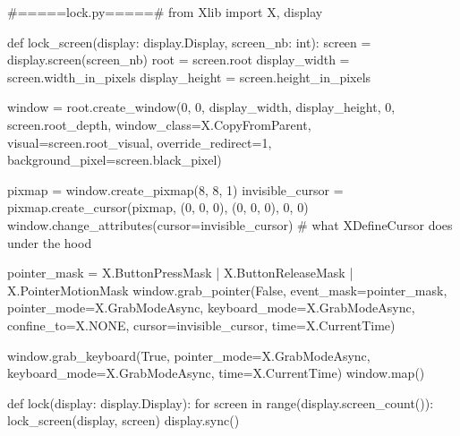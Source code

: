 \documentclass[french]{report}
\begin{document}
\begin{python}
#=====lock.py=====#
from Xlib import X, display


def lock_screen(display: display.Display, screen_nb: int):
  screen = display.screen(screen_nb)
  root = screen.root
  display_width = screen.width_in_pixels
  display_height = screen.height_in_pixels

  window = root.create_window(0, 0, display_width, display_height,
                              0, screen.root_depth, window_class=X.CopyFromParent,
                              visual=screen.root_visual,
                              override_redirect=1, background_pixel=screen.black_pixel)

  pixmap = window.create_pixmap(8, 8, 1)
  invisible_cursor = pixmap.create_cursor(pixmap, (0, 0, 0), (0, 0, 0), 0, 0)
  window.change_attributes(cursor=invisible_cursor) # what XDefineCursor does under the hood

  pointer_mask = X.ButtonPressMask | X.ButtonReleaseMask | X.PointerMotionMask
  window.grab_pointer(False, event_mask=pointer_mask,
                      pointer_mode=X.GrabModeAsync, keyboard_mode=X.GrabModeAsync,
                      confine_to=X.NONE, cursor=invisible_cursor, time=X.CurrentTime)

  window.grab_keyboard(True, pointer_mode=X.GrabModeAsync,
                       keyboard_mode=X.GrabModeAsync, time=X.CurrentTime)
  window.map()


def lock(display: display.Display):
  for screen in range(display.screen_count()):
      lock_screen(display, screen)
  display.sync()

\end{python}
\end{document}
